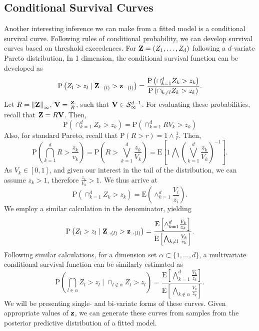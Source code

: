 \subsection{Conditional Survival Curves}
Another interesting inference we can make from a fitted model is a conditional survival curve.
  Following rules of conditional probability, we can develop survival curves based on
  threshold exceedences. For ${\bf Z} = (Z_1,\ldots,Z_d)$ following a $d$-variate Pareto distribution,
  In 1 dimension, the conditional survival function can be developed as
  \begin{equation}
    \label{eqn:condsurv1d}
    \text{P}\left(Z_l > z_l\mid {\bf Z}_{-(l)} > {\bf z}_{-(l)}\right) =
      \frac{\text{P}\left(\cap_{k = 1}^d Z_k > z_k\right)}{\text{P}\left(\cap_{k \neq l} Z_k > z_k\right)}.
  \end{equation}
  Let $R = \left\lVert {\bf Z} \right\rVert_{\infty}$, ${\bf V} = \frac{{\bf Z}}{R}$, such that ${\bf V}\in \mathcal{S}_{\infty}^{d-1}$.
  For evaluating these probabilities, recall that ${\bf Z} = R{\bf V}$.  Then,
  \begin{equation}
    \text{P}\left(\cap_{k = 1}^d Z_k > z_k\right) = \text{P}\left(\cap_{k = 1}^d RV_k > z_k\right)
  \end{equation}
  Also, for standard Pareto, recall that $\text{P}(R > r) = 1\wedge\frac{1}{r}$.  Then,
  \begin{equation}
    \text{P}\left(\bigcap_{k = 1}^d R > \frac{z_k}{v_k}\right) =
      \text{P}\left(R  > \bigvee_{k=1}^d\frac{z_k}{V_k}\right) =
      \text{E}\left[1 \bigwedge \left(\bigvee_{k = 1}^d\frac{z_k}{V_k}\right)^{-1}\right].
  \end{equation}
  As $V_k \in [0,1]$, and given our interest in the tail of the distribution, we can assume $z_k > 1$,
  therefore $\frac{z_k}{V_k} > 1$.  We thus arrive at
  \begin{equation}
    \text{P}\left(\cap_{k = 1}^dZ_k > z_k\right) = \text{E}\left(\wedge_{k = 1}^d\frac{V_i}{z_i}\right).
  \end{equation}
  We employ a similar calculation in the denominator, yielding
  \begin{equation}
    \label{eqn:condsurv1df}
    \text{P}\left(Z_l > z_l\mid {\bf Z}_{\neg(l)} > {\bf z}_{\neg(l)}\right) =
      \frac{\text{E}\left[\wedge_{k = 1}^d \frac{V_k}{z_k}\right]}{\text{E}\left[\bigwedge_{k \neq l}\frac{V_k}{z_k}\right]}.
  \end{equation}
  Following similar calculations, for a dimension set $\alpha \subset \{1,\ldots, d\}$, a multivariate
  conditional survival function can be similarly estimated as
  \begin{equation}
    \label{eqn:condsurv2df}
    \text{P}\left(\bigcap_{l \in \alpha} Z_l > z_l \mid \cap_{l\not\in\alpha} Z_l > z_l\right) =
      \frac{\text{E}\left[\bigwedge_{k = 1}^d \frac{V_k}{z_k}\right]}{\text{E}\left[\bigwedge_{k \not\in\alpha}\frac{V_k}{z_k}\right]}.
  \end{equation}
  We will be presenting single- and bi-variate forms of these curves.   Given appropriate values of
  ${\bf z}$, we can generate these curves from samples from the posterior predictive distribution of
  a fitted model.

